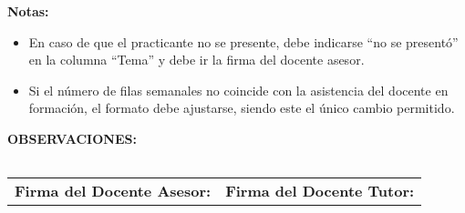 \documentclass[a4paper,12pt]{article}
\begin{document}
\vspace{0.5cm}
\noindent
\textbf{Notas:}
\begin{itemize}
    \item En caso de que el practicante no se presente, debe indicarse ``no se presentó'' en la columna ``Tema'' y debe ir la firma del docente asesor.
    \item Si el número de filas semanales no coincide con la asistencia del docente en formación, el formato debe ajustarse, siendo este el único cambio permitido.
\end{itemize}

\vspace{0.5cm}
\noindent
\textbf{OBSERVACIONES:} \\
\begin{tabularx}{\textwidth}{|X|}
    \hline
    \vspace{4cm} \\ %
    \hline
\end{tabularx}

\vspace{0.5cm}
\begin{center}
    \begin{tabular}{p{7cm}p{7cm}}
        \hline
        \textbf{Firma del Docente Asesor:} \hrulefill & \textbf{Firma del Docente Tutor:} \hrulefill \\
    \end{tabular}
\end{center}
\end{document}
